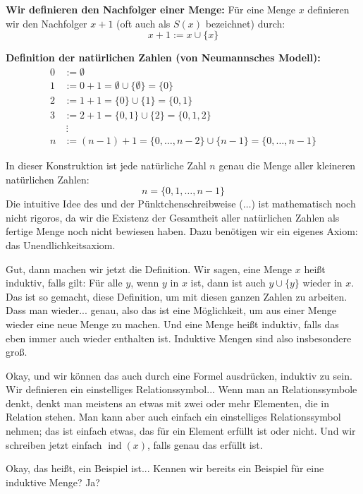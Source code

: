 \begin{math-stroke}
\textbf{Wir definieren den Nachfolger einer Menge:}
Für eine Menge $x$ definieren wir den Nachfolger $x + 1$ (oft auch als $S(x)$ bezeichnet) durch:
\[
x + 1 := x \cup \{x\}
\]

\textbf{Definition der natürlichen Zahlen (von Neumannsches Modell):}
\begin{align*}
0 &:= \emptyset \\
1 &:= 0 + 1 = \emptyset \cup \{\emptyset\} = \{0\} \\
2 &:= 1 + 1 = \{0\} \cup \{1\} = \{0, 1\} \\
3 &:= 2 + 1 = \{0, 1\} \cup \{2\} = \{0, 1, 2\} \\
&\ \vdots \\
n &:= (n-1) + 1 = \{0, \dots, n-2\} \cup \{n-1\} = \{0, \dots, n-1\}
\end{align*}

\begin{explanation-of-steps}
In dieser Konstruktion ist jede natürliche Zahl $n$ genau die Menge aller kleineren natürlichen Zahlen:
\[
n = \{0, 1, \dots, n-1\}
\]
Die intuitive Idee des  und der Pünktchenschreibweise ($\dots$) ist mathematisch noch nicht rigoros, da wir die Existenz der Gesamtheit aller natürlichen Zahlen als fertige Menge noch nicht bewiesen haben. Dazu benötigen wir ein eigenes Axiom: das Unendlichkeitsaxiom.
\end{explanation-of-steps}
\end{math-stroke}

\begin{spoken-clean}[00:20:01 - 00:22:54]
Gut, dann machen wir jetzt die Definition. Wir sagen, eine Menge $x$ heißt induktiv, falls gilt: Für alle $y$, wenn $y$ in $x$ ist, dann ist auch $y \cup \{y\}$ wieder in $x$. Das ist so gemacht, diese Definition, um mit diesen ganzen Zahlen zu arbeiten. Dass man wieder... genau, also das ist eine Möglichkeit, um aus einer Menge wieder eine neue Menge zu machen. Und eine Menge heißt induktiv, falls das eben immer auch wieder enthalten ist. Induktive Mengen sind also insbesondere groß.

Okay, und wir können das auch durch eine Formel ausdrücken, induktiv zu sein. Wir definieren ein einstelliges Relationssymbol... Wenn man an Relationssymbole denkt, denkt man meistens an etwas mit zwei oder mehr Elementen, die in Relation stehen. Man kann aber auch einfach ein einstelliges Relationssymbol nehmen; das ist einfach etwas, das für ein Element erfüllt ist oder nicht. Und wir schreiben jetzt einfach $\operatorname{ind}(x)$, falls genau das erfüllt ist.

Okay, das heißt, ein Beispiel ist... Kennen wir bereits ein Beispiel für eine induktive Menge? Ja?
\end{spoken-clean}

